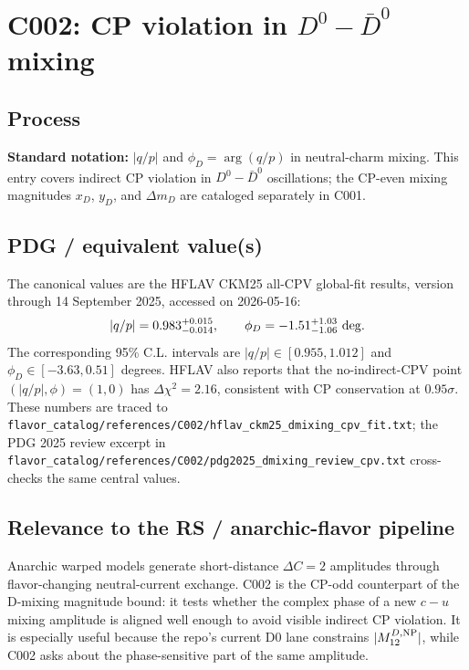 
\section{\texorpdfstring{C002: CP violation in \(D^0-\bar D^0\) mixing}{C002: CP violation in D0-D0bar mixing}}

\subsection*{Process}
\textbf{Standard notation:} \(|q/p|\) and \(\phi_D=\arg(q/p)\) in
neutral-charm mixing.  This entry covers indirect CP violation in
\(D^0-\bar D^0\) oscillations; the CP-even mixing magnitudes
\(x_D\), \(y_D\), and \(\Delta m_D\) are cataloged separately in C001.

\subsection*{PDG / equivalent value(s)}
The canonical values are the HFLAV CKM25 all-CPV global-fit results, version
through 14 September 2025, accessed on 2026-05-16:
\[
  |q/p| = 0.983^{+0.015}_{-0.014},\qquad
  \phi_D = -1.51^{+1.03}_{-1.06}\ {\rm deg}.
\]
The corresponding 95\% C.L. intervals are \(|q/p|\in[0.955,1.012]\) and
\(\phi_D\in[-3.63,0.51]\) degrees.  HFLAV also reports that the no-indirect-CPV
point \((|q/p|,\phi)=(1,0)\) has \(\Delta\chi^2=2.16\), consistent with CP
conservation at \(0.95\sigma\).  These numbers are traced to
\texttt{flavor\_catalog/references/C002/hflav\_ckm25\_dmixing\_cpv\_fit.txt};
the PDG 2025 review excerpt in
\texttt{flavor\_catalog/references/C002/pdg2025\_dmixing\_review\_cpv.txt}
cross-checks the same central values.

\subsection*{Relevance to the RS / anarchic-flavor pipeline}
Anarchic warped models generate short-distance \(\Delta C=2\) amplitudes
through flavor-changing neutral-current exchange.  C002 is the CP-odd
counterpart of the D-mixing magnitude bound: it tests whether the complex
phase of a new \(c-u\) mixing amplitude is aligned well enough to avoid
visible indirect CP violation.  It is especially useful because the repo's
current D0 lane constrains \(|M_{12}^{D,{\rm NP}}|\), while C002 asks about the
phase-sensitive part of the same amplitude.


